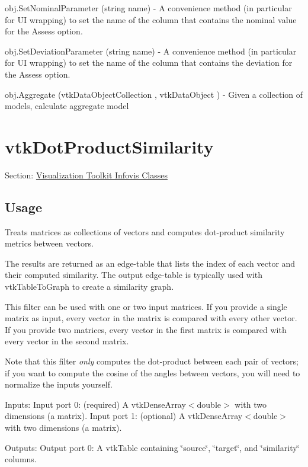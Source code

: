 \begin{DoxyItemize}
\item {\ttfamily obj.\-Set\-Nominal\-Parameter (string name)} -\/ A convenience method (in particular for U\-I wrapping) to set the name of the column that contains the nominal value for the Assess option.  
\item {\ttfamily obj.\-Set\-Deviation\-Parameter (string name)} -\/ A convenience method (in particular for U\-I wrapping) to set the name of the column that contains the deviation for the Assess option.  
\item {\ttfamily obj.\-Aggregate (vtk\-Data\-Object\-Collection , vtk\-Data\-Object )} -\/ Given a collection of models, calculate aggregate model  
\end{DoxyItemize}\hypertarget{vtkinfovis_vtkdotproductsimilarity}{}\section{vtk\-Dot\-Product\-Similarity}\label{vtkinfovis_vtkdotproductsimilarity}
Section\-: \hyperlink{sec_vtkinfovis}{Visualization Toolkit Infovis Classes} \hypertarget{vtkwidgets_vtkxyplotwidget_Usage}{}\subsection{Usage}\label{vtkwidgets_vtkxyplotwidget_Usage}
Treats matrices as collections of vectors and computes dot-\/product similarity metrics between vectors.

The results are returned as an edge-\/table that lists the index of each vector and their computed similarity. The output edge-\/table is typically used with vtk\-Table\-To\-Graph to create a similarity graph.

This filter can be used with one or two input matrices. If you provide a single matrix as input, every vector in the matrix is compared with every other vector. If you provide two matrices, every vector in the first matrix is compared with every vector in the second matrix.

Note that this filter {\itshape only} computes the dot-\/product between each pair of vectors; if you want to compute the cosine of the angles between vectors, you will need to normalize the inputs yourself.

Inputs\-: Input port 0\-: (required) A vtk\-Dense\-Array$<$double$>$ with two dimensions (a matrix). Input port 1\-: (optional) A vtk\-Dense\-Array$<$double$>$ with two dimensions (a matrix).

Outputs\-: Output port 0\-: A vtk\-Table containing \char`\"{}source\char`\"{}, \char`\"{}target\char`\"{}, and \char`\"{}similarity\char`\"{} columns.

